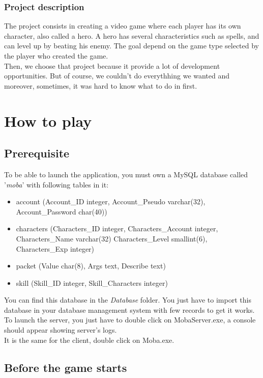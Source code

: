 \documentclass{scrreprt}
\begin{document}
		  \section{Project description} %
		  The project consists in creating a video game where each player has its own character, also 
		  called a hero. A hero has several characteristics such as %
		  spells, and can level up by beating his enemy. The goal depend on the game type selected by the player who created the game.\\

		  Then, we choose that project because it provide a lot of development opportunities. But of course, we couldn't do everythhing we wanted and moreover, sometimes, it was hard to know what to do in first.

		  \part{How to play}
		  \chapter{Prerequisite}
		  To be able to launch the application, you must own a MySQL database called '\emph{moba}' with following tables in it:
		  \begin{itemize}
		  \item{account (Account\_ID integer, Account\_Pseudo varchar(32), Account\_Password char(40))}
		  \item{characters (Characters\_ID integer, Characters\_Account integer, Characters\_Name varchar(32) Characters\_Level smallint(6), Characters\_Exp integer)}
		  \item{packet (Value char(8), Args text, Describe text)}
		  \item{skill (Skill\_ID integer, Skill\_Characters integer)}
		  \end{itemize}

		  You can find this database in the \emph{Database} folder. You just have to import this database in your database management system with few records to get it works.\\

		  To launch the server, you just have to double click on MobaServer.exe, a console should appear showing server's logs.\\
			  It is the same for the client, double click on Moba.exe.

			  \chapter{Before the game starts}
\end{document}
